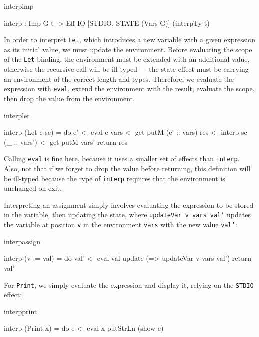 \begin{SaveVerbatim}{interpimp}

interp : Imp G t -> 
         Eff IO [STDIO, STATE (Vars G)] (interpTy t)

\end{SaveVerbatim}

In order to interpret \texttt{Let}, which introduces a new variable with
a given expression as its initial value, we must update the environment.
Before evaluating the scope of the \texttt{Let} binding, the environment
must be extended with an additional value, otherwise the recursive call
will be ill-typed --- the state effect must be carrying an environment
of the correct length and types. Therefore, we evaluate the expression
with \texttt{eval}, extend the environment with the result, evaluate the
scope, then drop the value from the environment.

\begin{SaveVerbatim}{interplet}

interp (Let e sc) 
     = do e' <- eval e
          vars <- get
          putM (e' :: vars)
          res <- interp sc
          (_ :: vars') <- get
          putM vars'
          return res
\end{SaveVerbatim}

\noindent
Calling \texttt{eval} is fine here, because it uses a smaller set of effects
than \texttt{interp}. Also, not that if we forget to drop the value before
returning, this definition will be ill-typed because the type of
\texttt{interp} requires that the environment is unchanged on exit.

Interpreting an assignment simply involves evaluating the expression to be
stored in the variable, then updating the state, where \texttt{updateVar v vars
val'}
updates the variable at position \texttt{v} in the environment \texttt{vars} with
the new value \texttt{val'}:

\begin{SaveVerbatim}{interpassign}

interp (v := val) 
     = do val' <- eval val
          update (\vars => updateVar v vars val')
          return val'

\end{SaveVerbatim}

\noindent
For \texttt{Print}, we simply evaluate the expression and display it, relying
on the \texttt{STDIO} effect:

\begin{SaveVerbatim}{interpprint}

interp (Print x) 
     = do e <- eval x
          putStrLn (show e)

\end{SaveVerbatim}


